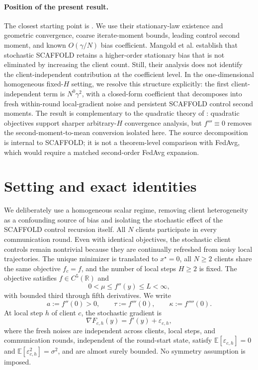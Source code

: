 \documentclass[11pt]{article}
\theoremstyle{definition}
\newcommand{\E}{\mathbb{E}}
\newcommand{\R}{\mathbb{R}}
\newcommand{\Scaf}{\textnormal{\textsc{SCAFFOLD}}}
\newcommand{\eps}{\varepsilon}
\begin{document}
\paragraph{Position of the present result.}
The closest starting point is \citet{mangold2025scaffold}. We use their stationary-law existence and geometric convergence, coarse iterate-moment bounds, leading control second moment, and known $O(\gamma/N)$ bias coefficient. Mangold et al. establish that stochastic \Scaf{} retains a higher-order stationary bias that is not eliminated by increasing the client count. Still, their analysis does not identify the client-independent contribution at the coefficient level. In the one-dimensional homogeneous fixed-$H$ setting, we resolve this structure explicitly: the first client-independent term is $N^0\gamma^2$, with a closed-form coefficient that decomposes into fresh within-round local-gradient noise and persistent \Scaf{} control second moments. The result is complementary to the quadratic theory of \citet{mangold2025sharper}: quadratic objectives support sharper arbitrary-$H$ convergence analysis, but $f'''\equiv0$ removes the second-moment-to-mean conversion isolated here. The source decomposition is internal to \Scaf{}; it is not a theorem-level comparison with FedAvg, which would require a matched second-order FedAvg expansion.

\section{Setting and exact identities}
\label{sec:setting}

We deliberately use a homogeneous scalar regime, removing client heterogeneity as a confounding source of bias and isolating the stochastic effect of the \Scaf{} control recursion itself. All $N$ clients participate in every communication round. Even with identical objectives, the stochastic client controls remain nontrivial because they are continually refreshed from noisy local trajectories. The unique minimizer is translated to $x^\star=0$, all $N\ge2$ clients share the same objective $f_c=f$, and the number of local steps $H\ge2$ is fixed. The objective satisfies $f\in C^5(\R)$ and
\[
0<\mu\le f''(y)\le L<\infty,
\]
with bounded third through fifth derivatives. We write
\[
a:=f''(0)>0,\qquad \tau:=f'''(0),\qquad \kappa:=f''''(0).
\]
At local step $h$ of client $c$, the stochastic gradient is
\[
\nabla F_{c,h}(y)=f'(y)+\eps_{c,h},
\]
where the fresh noises are independent across clients, local steps, and communication rounds, independent of the round-start state, satisfy $\E[\eps_{c,h}]=0$ and $\E[\eps_{c,h}^2]=\sigma^2$, and are almost surely bounded. No symmetry assumption is imposed.
\end{document}

